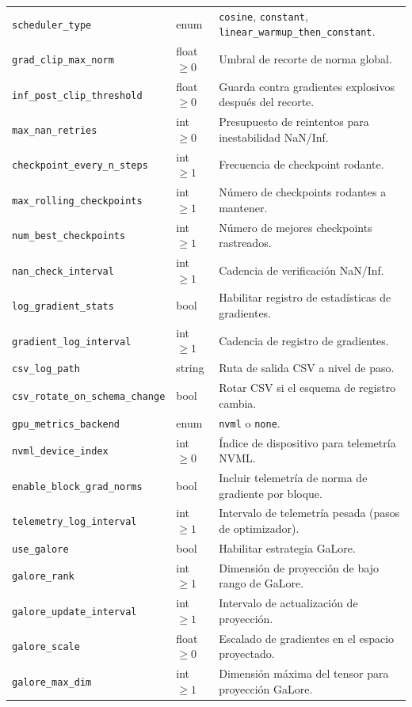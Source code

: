 \begin{longtable}{p{5.1cm}p{2.4cm}p{7.0cm}}
\texttt{scheduler\_type} & enum & \texttt{cosine}, \texttt{constant}, \texttt{linear\_warmup\_then\_constant}. \\
\texttt{grad\_clip\_max\_norm} & float $\ge 0$ & Umbral de recorte de norma global. \\
\texttt{inf\_post\_clip\_threshold} & float $\ge 0$ & Guarda contra gradientes explosivos después del recorte. \\
\texttt{max\_nan\_retries} & int $\ge 0$ & Presupuesto de reintentos para inestabilidad NaN/Inf. \\
\texttt{checkpoint\_every\_n\_steps} & int $\ge 1$ & Frecuencia de checkpoint rodante. \\
\texttt{max\_rolling\_checkpoints} & int $\ge 1$ & Número de checkpoints rodantes a mantener. \\
\texttt{num\_best\_checkpoints} & int $\ge 1$ & Número de mejores checkpoints rastreados. \\
\texttt{nan\_check\_interval} & int $\ge 1$ & Cadencia de verificación NaN/Inf. \\
\texttt{log\_gradient\_stats} & bool & Habilitar registro de estadísticas de gradientes. \\
\texttt{gradient\_log\_interval} & int $\ge 1$ & Cadencia de registro de gradientes. \\
\texttt{csv\_log\_path} & string & Ruta de salida CSV a nivel de paso. \\
\texttt{csv\_rotate\_on\_schema\_change} & bool & Rotar CSV si el esquema de registro cambia. \\
\texttt{gpu\_metrics\_backend} & enum & \texttt{nvml} o \texttt{none}. \\
\texttt{nvml\_device\_index} & int $\ge 0$ & Índice de dispositivo para telemetría NVML. \\
\texttt{enable\_block\_grad\_norms} & bool & Incluir telemetría de norma de gradiente por bloque. \\
\texttt{telemetry\_log\_interval} & int $\ge 1$ & Intervalo de telemetría pesada (pasos de optimizador). \\
\texttt{use\_galore} & bool & Habilitar estrategia GaLore. \\
\texttt{galore\_rank} & int $\ge 1$ & Dimensión de proyección de bajo rango de GaLore. \\
\texttt{galore\_update\_interval} & int $\ge 1$ & Intervalo de actualización de proyección. \\
\texttt{galore\_scale} & float $\ge 0$ & Escalado de gradientes en el espacio proyectado. \\
\texttt{galore\_max\_dim} & int $\ge 1$ & Dimensión máxima del tensor para proyección GaLore. \\
\bottomrule
\end{longtable}
\normalsize

